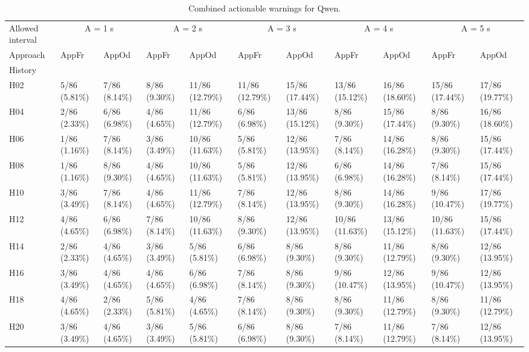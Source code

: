 \begin{table}[tbp]
\caption{Combined actionable warnings for Qwen.}
\label{tab:rq4-qwen-actionable-paper-table}
\begin{tabular}{lllllllllll}
\toprule
Allowed interval & \multicolumn{2}{c}{A = 1 s} & \multicolumn{2}{c}{A = 2 s} & \multicolumn{2}{c}{A = 3 s} & \multicolumn{2}{c}{A = 4 s} & \multicolumn{2}{c}{A = 5 s} \\
Approach & AppFr & AppOd & AppFr & AppOd & AppFr & AppOd & AppFr & AppOd & AppFr & AppOd \\
History &  &  &  &  &  &  &  &  &  &  \\
\midrule
H02 & 5/86 (5.81\%) & 7/86 (8.14\%) & 8/86 (9.30\%) & 11/86 (12.79\%) & 11/86 (12.79\%) & 15/86 (17.44\%) & 13/86 (15.12\%) & 16/86 (18.60\%) & 15/86 (17.44\%) & 17/86 (19.77\%) \\
H04 & 2/86 (2.33\%) & 6/86 (6.98\%) & 4/86 (4.65\%) & 11/86 (12.79\%) & 6/86 (6.98\%) & 13/86 (15.12\%) & 8/86 (9.30\%) & 15/86 (17.44\%) & 8/86 (9.30\%) & 16/86 (18.60\%) \\
H06 & 1/86 (1.16\%) & 7/86 (8.14\%) & 3/86 (3.49\%) & 10/86 (11.63\%) & 5/86 (5.81\%) & 12/86 (13.95\%) & 7/86 (8.14\%) & 14/86 (16.28\%) & 8/86 (9.30\%) & 15/86 (17.44\%) \\
H08 & 1/86 (1.16\%) & 8/86 (9.30\%) & 4/86 (4.65\%) & 10/86 (11.63\%) & 5/86 (5.81\%) & 12/86 (13.95\%) & 6/86 (6.98\%) & 14/86 (16.28\%) & 7/86 (8.14\%) & 15/86 (17.44\%) \\
H10 & 3/86 (3.49\%) & 7/86 (8.14\%) & 4/86 (4.65\%) & 11/86 (12.79\%) & 7/86 (8.14\%) & 12/86 (13.95\%) & 8/86 (9.30\%) & 14/86 (16.28\%) & 9/86 (10.47\%) & 17/86 (19.77\%) \\
H12 & 4/86 (4.65\%) & 6/86 (6.98\%) & 7/86 (8.14\%) & 10/86 (11.63\%) & 8/86 (9.30\%) & 12/86 (13.95\%) & 10/86 (11.63\%) & 13/86 (15.12\%) & 10/86 (11.63\%) & 15/86 (17.44\%) \\
H14 & 2/86 (2.33\%) & 4/86 (4.65\%) & 3/86 (3.49\%) & 5/86 (5.81\%) & 6/86 (6.98\%) & 8/86 (9.30\%) & 8/86 (9.30\%) & 11/86 (12.79\%) & 8/86 (9.30\%) & 12/86 (13.95\%) \\
H16 & 3/86 (3.49\%) & 4/86 (4.65\%) & 4/86 (4.65\%) & 6/86 (6.98\%) & 7/86 (8.14\%) & 8/86 (9.30\%) & 9/86 (10.47\%) & 12/86 (13.95\%) & 9/86 (10.47\%) & 12/86 (13.95\%) \\
H18 & 4/86 (4.65\%) & 2/86 (2.33\%) & 5/86 (5.81\%) & 4/86 (4.65\%) & 7/86 (8.14\%) & 8/86 (9.30\%) & 8/86 (9.30\%) & 11/86 (12.79\%) & 8/86 (9.30\%) & 11/86 (12.79\%) \\
H20 & 3/86 (3.49\%) & 4/86 (4.65\%) & 3/86 (3.49\%) & 5/86 (5.81\%) & 6/86 (6.98\%) & 8/86 (9.30\%) & 7/86 (8.14\%) & 11/86 (12.79\%) & 7/86 (8.14\%) & 12/86 (13.95\%) \\

\end{tabular}
\end{table}
